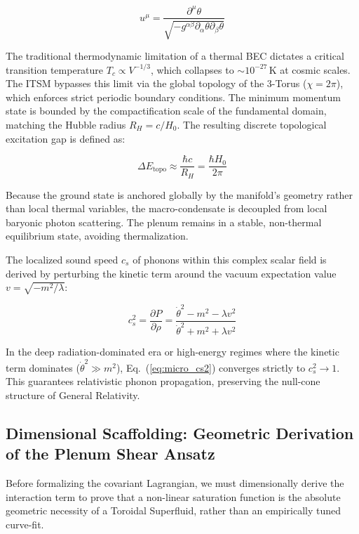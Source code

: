 \documentclass[aps,prd,10pt,twocolumn,superscriptaddress,nofootinbib]{revtex4-2}
\begin{document}
\begin{equation}
u^\mu = \frac{\partial^\mu \theta}{\sqrt{-g^{\alpha\beta}\partial_\alpha \theta \partial_\beta \theta}}
\end{equation}

The traditional thermodynamic limitation of a thermal BEC dictates a critical transition temperature $T_c \propto V^{-1/3}$, which collapses to $\sim 10^{-27}\,\text{K}$ at cosmic scales. The ITSM bypasses this limit via the global topology of the 3-Torus ($\chi = 2\pi$), which enforces strict periodic boundary conditions. The minimum momentum state is bounded by the compactification scale of the fundamental domain, matching the Hubble radius $R_H = c/H_0$. The resulting discrete topological excitation gap is defined as:

\begin{equation}
\Delta E_{\text{topo}} \approx \frac{\hbar c}{R_H} = \frac{\hbar H_0}{2\pi}
\end{equation}

Because the ground state is anchored globally by the manifold's geometry rather than local thermal variables, the macro-condensate is decoupled from local baryonic photon scattering. The plenum remains in a stable, non-thermal equilibrium state, avoiding thermalization.

The localized sound speed $c_s$ of phonons within this complex scalar field is derived by perturbing the kinetic term around the vacuum expectation value $v = \sqrt{-m^2/\lambda}$:

\begin{equation}\label{eq:micro_cs2}
c_s^2 = \frac{\partial P}{\partial \rho} = \frac{\dot{\theta}^2 - m^2 - \lambda v^2}{\dot{\theta}^2 + m^2 + \lambda v^2}
\end{equation}

In the deep radiation-dominated era or high-energy regimes where the kinetic term dominates ($\dot{\theta}^2 \gg m^2$), Eq.~(\ref{eq:micro_cs2}) converges strictly to $c_s^2 \to 1$. This guarantees relativistic phonon propagation, preserving the null-cone structure of General Relativity.

\subsection{Dimensional Scaffolding: Geometric Derivation of the Plenum Shear Ansatz}
Before formalizing the covariant Lagrangian, we must dimensionally derive the interaction term to prove that a non-linear saturation function is the absolute geometric necessity of a Toroidal Superfluid, rather than an empirically tuned curve-fit.
\end{document}
